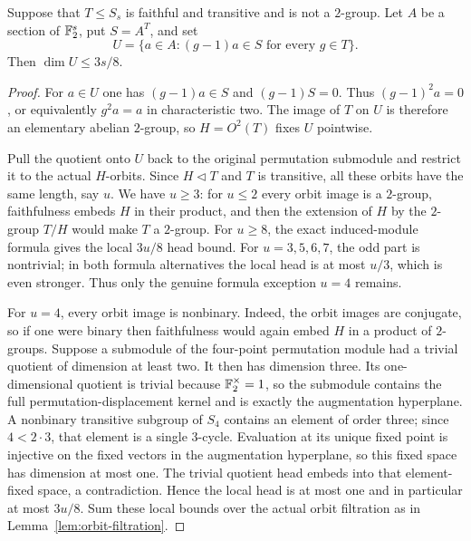 \begin{lemma}\label{lem:unipotent}
Suppose that $T\leq S_s$ is faithful and transitive and is not a
$2$-group.  Let $A$ be a section of $\mathbb F_2^s$, put $S=A^T$, and set
\[
 U=\{a\in A:(g-1)a\in S\text{ for every }g\in T\}.
\]
Then $\dim U\leq3s/8$.
\end{lemma}
\begin{proof}
For $a\in U$ one has $(g-1)a\in S$ and $(g-1)S=0$.  Thus
$(g-1)^2a=0$, or equivalently $g^2a=a$ in characteristic two.  The
image of $T$ on $U$ is therefore an elementary abelian $2$-group, so
$H=O^2(T)$ fixes $U$ pointwise.

Pull the quotient onto $U$ back to the original permutation submodule
and restrict it to the actual $H$-orbits.  Since $H\lhd T$ and $T$ is
transitive, all these orbits have the same length, say $u$.  We have
$u\geq3$: for $u\leq2$ every orbit image is a $2$-group, faithfulness
embeds $H$ in their product, and then the extension of $H$ by the
$2$-group $T/H$ would make $T$ a $2$-group.
For $u\geq8$, the exact induced-module formula gives the local
$3u/8$ head bound.  For $u=3,5,6,7$, the odd part is nontrivial;
in both formula alternatives the local head is at most $u/3$, which is
even stronger.  Thus only the genuine formula exception $u=4$ remains.

For $u=4$, every orbit image is nonbinary.  Indeed, the orbit images
are conjugate, so if one were binary then faithfulness would again
embed $H$ in a product of $2$-groups.  Suppose a submodule of the
four-point permutation module had a trivial quotient of dimension at
least two.  It then has dimension three.  Its one-dimensional quotient
is trivial because $\mathbb F_2^\times=1$, so the submodule contains the full
permutation-displacement kernel and is exactly the augmentation
hyperplane.  A nonbinary transitive subgroup of $S_4$ contains an
element of order three; since $4<2\cdot3$, that element is a single
$3$-cycle.  Evaluation at its unique fixed point is injective on the
fixed vectors in the augmentation hyperplane, so this fixed space has
dimension at most one.  The trivial quotient head embeds into that
element-fixed space, a contradiction.  Hence the local head is at most
one and in particular at most $3u/8$.  Sum these local bounds over the
actual orbit filtration as in Lemma~\ref{lem:orbit-filtration}.
\end{proof}


